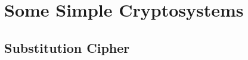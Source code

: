 
\section{Some Simple Cryptosystems}
\setcounter{theorem}{0}
\setcounter{equation}{0}

\subsection{Substitution Cipher}

